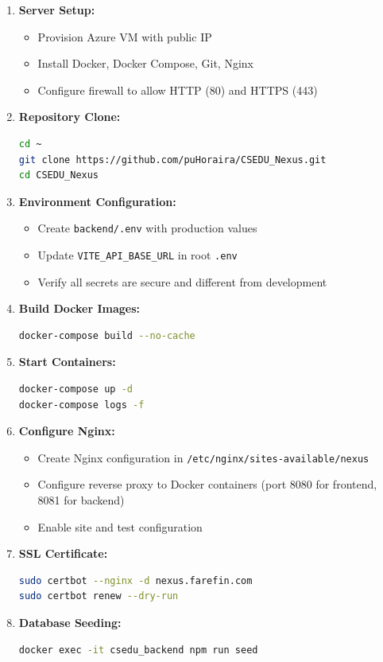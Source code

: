 \documentclass[12pt,a4paper]{article}
\begin{document}
\begin{enumerate}[noitemsep]
  \item \textbf{Server Setup:}
  \begin{itemize}[noitemsep]
    \item Provision Azure VM with public IP
    \item Install Docker, Docker Compose, Git, Nginx
    \item Configure firewall to allow HTTP (80) and HTTPS (443)
  \end{itemize}
  
  \item \textbf{Repository Clone:}
  \begin{lstlisting}[language=bash]
cd ~
git clone https://github.com/puHoraira/CSEDU_Nexus.git
cd CSEDU_Nexus
  \end{lstlisting}
  
  \item \textbf{Environment Configuration:}
  \begin{itemize}[noitemsep]
    \item Create \texttt{backend/.env} with production values
    \item Update \texttt{VITE\_API\_BASE\_URL} in root \texttt{.env}
    \item Verify all secrets are secure and different from development
  \end{itemize}
  
  \item \textbf{Build Docker Images:}
  \begin{lstlisting}[language=bash]
docker-compose build --no-cache
  \end{lstlisting}
  
  \item \textbf{Start Containers:}
  \begin{lstlisting}[language=bash]
docker-compose up -d
docker-compose logs -f
  \end{lstlisting}
  
  \item \textbf{Configure Nginx:}
  \begin{itemize}[noitemsep]
    \item Create Nginx configuration in \texttt{/etc/nginx/sites-available/nexus}
    \item Configure reverse proxy to Docker containers (port 8080 for frontend, 8081 for backend)
    \item Enable site and test configuration
  \end{itemize}
  
  \item \textbf{SSL Certificate:}
  \begin{lstlisting}[language=bash]
sudo certbot --nginx -d nexus.farefin.com
sudo certbot renew --dry-run
  \end{lstlisting}
  
  \item \textbf{Database Seeding:}
  \begin{lstlisting}[language=bash]
docker exec -it csedu_backend npm run seed
  \end{lstlisting}
\end{enumerate}
\end{document}
